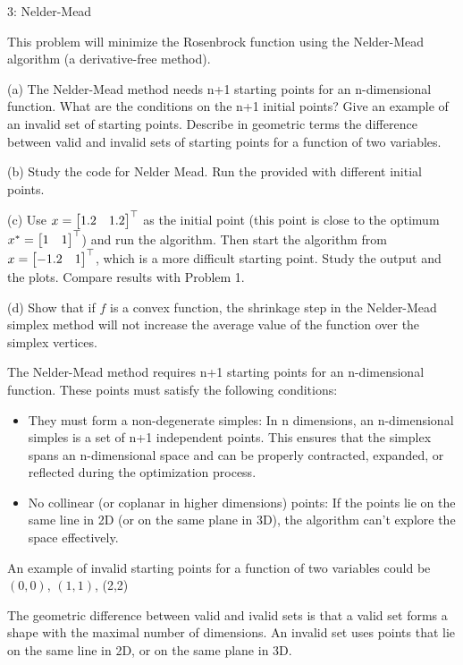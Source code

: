 
\begin{problem}{3: Nelder-Mead}

  This problem will minimize the Rosenbrock function using the Nelder-Mead algorithm (a derivative-free method). 
  
  \medskip (a) The Nelder-Mead method needs n+1 starting points for an n-dimensional function. What are
  the conditions on the n+1 initial points? Give an example of an invalid set of starting points. Describe in geometric terms 
  the difference between valid and invalid sets of starting points for a function of two variables.
  
  \medskip (b) Study the code for Nelder Mead. Run the provided with different initial points. 

  \medskip (c) Use $x = \begin{bmatrix} 1.2 & 1.2 \end{bmatrix}^{\top}$ as the initial point (this point is close to the optimum $x^* = \begin{bmatrix} 1 & 1 \end{bmatrix}^{\top}$) and run the algorithm. 
  Then start the algorithm from $x = \begin{bmatrix} -1.2 & 1 \end{bmatrix}^{\top}$, which is a more difficult starting point. Study the output and the plots. Compare results with Problem 1. 
  
  \medskip (d) Show that if $f$ is a convex function, the shrinkage step in the Nelder-Mead simplex method will not increase the average value of the 
  function over the simplex vertices. 
\end{problem}



The Nelder-Mead method requires n+1 starting points for an n-dimensional function. These points must satisfy the following 
conditions:
\begin{itemize}
  \item They must form a non-degenerate simples: In n dimensions, an n-dimensional simples is a set of n+1 independent points. 
  This ensures that the simplex spans an n-dimensional space and can be properly contracted, expanded, or reflected during the optimization process. 
  \item No collinear (or coplanar in higher dimensions) points: If the points lie on the same line in 2D (or on the same plane in 3D), the algorithm can't explore the space 
  effectively. 
\end{itemize}

An example of invalid starting points for a function of two variables could be $(0,0)$, $(1,1)$, (2,2)

\medskip The geometric difference between valid and ivalid sets is that a valid set forms a shape with the maximal number of dimensions. 
An invalid set uses points that lie on the same line in 2D, or on the same plane in 3D.

